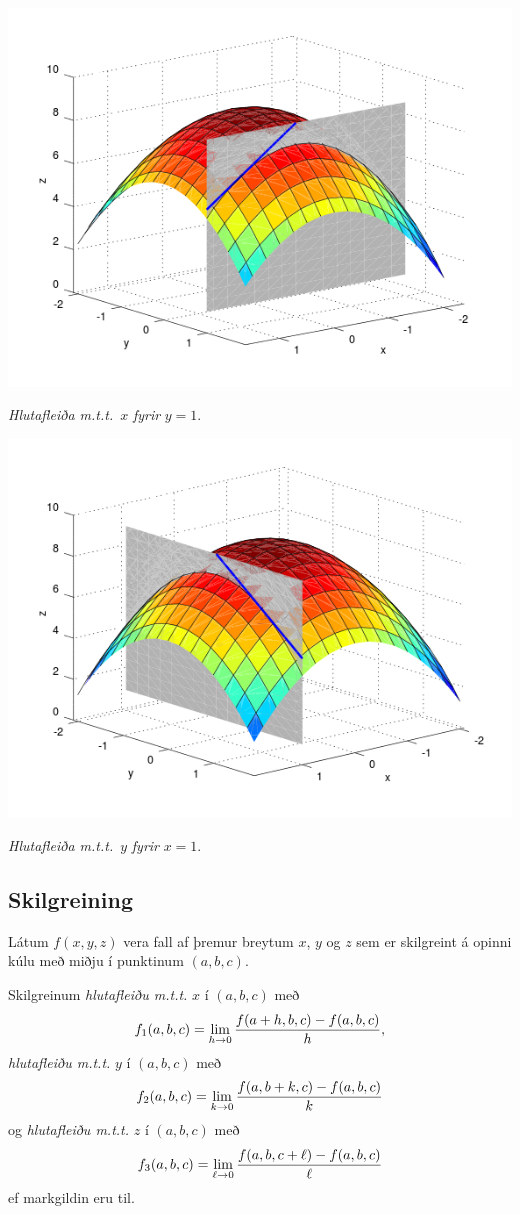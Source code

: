 \documentclass[a4paper,10pt,icelandic]{sphinxmanual}
\begin{document}
{\hfill\includegraphics[width=0.600\linewidth]{xpart.png}\hfill}

\emph{Hlutafleiða m.t.t.} \(x\) \emph{fyrir} \(y=1\).

{\hfill\includegraphics[width=0.600\linewidth]{ypart.png}\hfill}

\emph{Hlutafleiða m.t.t.} \(y\) \emph{fyrir} \(x=1\).


\subsection{Skilgreining}
\label{Kafli2:id11}
Látum \(f(x,y,z)\) vera fall af þremur breytum \(x\), \(y\)
og \(z\) sem er skilgreint á opinni kúlu með miðju í punktinum
\((a, b,c)\).

Skilgreinum \emph{hlutafleiðu m.t.t.} \(x\) í \((a,b,c)\) með
\begin{gather}
\begin{split}\displaystyle f_1(a,b,c)=\lim_{h\rightarrow 0}\frac{f(a+h,b,c)-f(a,b,c)}{h},\end{split}\notag
\end{gather}
\emph{hlutafleiðu m.t.t.} \(y\) í \((a,b,c)\) með
\begin{gather}
\begin{split}\displaystyle f_2(a,b,c)=\lim_{k\rightarrow 0}\frac{f(a,b+k,c)-f(a,b,c)}{k}\end{split}\notag
\end{gather}
og \emph{hlutafleiðu m.t.t.} \(z\) í \((a,b,c)\) með
\begin{gather}
\begin{split}\displaystyle f_3(a,b,c)=\lim_{\ell\rightarrow 0}\frac{f(a,b,c+\ell)-f(a,b,c)}{\ell}\end{split}\notag
\end{gather}
ef markgildin eru til.
\end{document}
